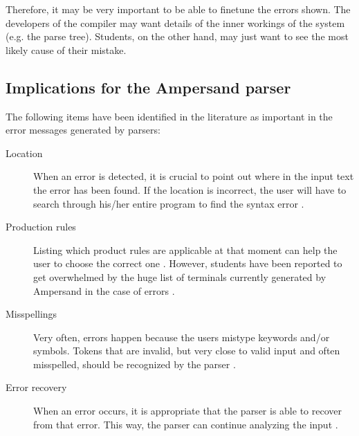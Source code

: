 Therefore, it may be very important to be able to finetune the errors shown.
The developers of the compiler may want details of the inner workings of the system (e.g. the parse tree).
Students, on the other hand, may just want to see the most likely cause of their mistake.

\subsection{Implications for the Ampersand parser}
\label{subsec:errors-ampersand}
The following items have been identified in the literature as important in the error messages generated by parsers:
\begin{description}
	\item[Location] When an error is detected, it is crucial to point out where in the input text the error has been found.
		If the location is incorrect, the user will have to search through his/her entire program to find the syntax error .
	\item[Production rules] Listing which product rules are applicable at that moment can help the user to choose the correct one .
		However, students have been reported to get overwhelmed by the huge list of terminals currently generated by Ampersand in the case of errors . 
	\item[Misspellings] Very often, errors happen because the users mistype keywords and/or symbols.
		Tokens that are invalid, but very close to valid input and often misspelled, should be recognized by the parser .
	\item[Error recovery] When an error occurs, it is appropriate that the parser is able to recover from that error.
		This way, the parser can continue analyzing the input .
\end{description}
